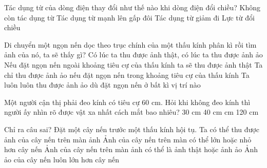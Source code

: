 \begin{ex}
	Tác dụng từ của dòng điện thay đổi như thế nào khi dòng điện đổi chiều?
	\choice
	{Không còn tác dụng từ}
	{Tác dụng từ mạnh lên gấp đôi}
	{Tác dụng từ giảm đi}
	{\True Lực từ đổi chiều}
	\loigiai{}
\end{ex}

\begin{ex}
	Di chuyển một ngọn nến dọc theo trục chính của một thấu kính phân kì rồi tìm ảnh của nó, ta sẽ thấy gì?
	\choice
	{Có lúc ta thu được ảnh thật, có lúc ta thu được ảnh ảo}
	{Nếu đặt ngọn nến ngoài khoảng tiêu cự của thấu kính ta sẽ thu được ảnh thật}
	{Ta chỉ thu được ảnh ảo nếu đặt ngọn nến trong khoảng tiêu cự của thấu kính}
	{\True Ta luôn luôn thu được ảnh ảo dù đặt ngọn nến ở bất kì vị trí nào}
	\loigiai{}
\end{ex}

\begin{ex}
	Một người cận thị phải đeo kính có tiêu cự 60 cm. Hỏi khi không đeo kính thì người ấy nhìn rõ được vật xa nhất cách mắt bao nhiêu?
	\choice
	{30 cm}
	{40 cm}
	{ cm}
	{120 cm}
	\loigiai{}
\end{ex}

\begin{ex}
	Chỉ ra câu sai?
	Đặt một cây nến trước một thấu kính hội tụ.
	\choice
	{Ta có thể thu được ảnh của cây nến trên màn ảnh}
	{Ảnh của cây nến trên màn có thể lớn hoặc nhỏ hơn cây nến}
	{\True Ảnh của cây nến trên màn ảnh có thể là ảnh thật hoặc ảnh ảo}
	{Ảnh ảo của cây nến luôn lớn hơn cây nến}
	\loigiai{}
\end{ex}

\begin{ex}
	\loigiai{}
\end{ex}

